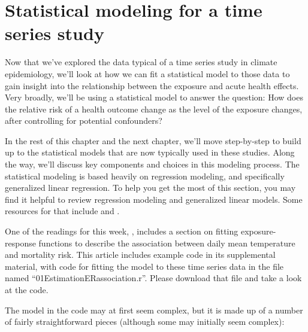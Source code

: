 \documentclass[
]{book}
\begin{document}
\hypertarget{statistical-modeling-for-a-time-series-study}{%
\section{Statistical modeling for a time series study}\label{statistical-modeling-for-a-time-series-study}}

Now that we've explored the data typical of a time series study in climate
epidemiology, we'll look at how we can fit a statistical model to those
data to gain insight into the relationship between the exposure and
acute health effects. Very broadly, we'll be using a statistical model to answer
the question: How does the relative risk of a health outcome change as
the level of the exposure changes, after controlling for potential confounders?

In the rest of this chapter and the next chapter, we'll
move step-by-step to build up to the statistical models that are now typically
used in these studies.
Along the way, we'll discuss key components and choices in this modeling process.
The statistical modeling is based heavily on regression modeling, and specifically
generalized linear regression. To help you get the most of this section, you
may find it helpful to review regression modeling and generalized linear models.
Some resources for that include \citet{dunn2018generalized1} and \citet{james2013introduction3} .

One of the readings for this week, \citet{vicedo2019hands}, includes a section
on fitting exposure-response functions to describe the association between
daily mean temperature and mortality risk. This article includes example
code in its supplemental material, with code for fitting the model to
these time series data in the file named ``01EstimationERassociation.r''.
Please download that file and take a look at the code.

The model in the code may at first seem complex, but it is made up of a number of
fairly straightforward pieces (although some may initially seem complex):
\end{document}
